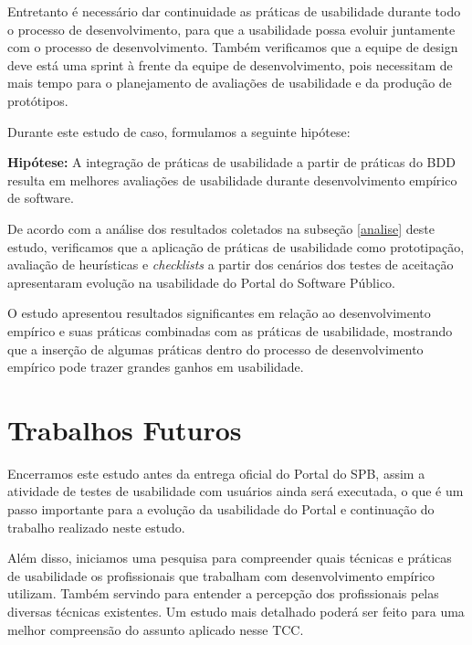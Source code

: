 Entretanto é necessário dar continuidade as práticas de usabilidade durante todo o processo de desenvolvimento, para que a usabilidade possa evoluir juntamente com o processo de desenvolvimento. Também verificamos que a equipe de design deve está uma sprint à frente da equipe de desenvolvimento, pois necessitam de mais tempo para o planejamento de avaliações de usabilidade e da produção de protótipos.




Durante este estudo de caso, formulamos a seguinte hipótese:

\textbf{Hipótese: } A integração de práticas de usabilidade a partir de práticas do BDD resulta em melhores avaliações de usabilidade durante desenvolvimento empírico de software.

De acordo com a análise dos resultados coletados na subseção \ref{analise} deste estudo, verificamos que a aplicação de práticas de usabilidade como prototipação, avaliação de heurísticas e \textit{checklists} a partir dos cenários dos testes de aceitação apresentaram evolução na usabilidade do Portal do Software Público.


O estudo apresentou resultados significantes em relação ao desenvolvimento empírico	e suas práticas combinadas com as práticas de usabilidade, mostrando que a inserção de algumas práticas dentro do processo de desenvolvimento empírico pode trazer grandes ganhos em usabilidade.

\section{Trabalhos Futuros}

Encerramos este estudo antes da entrega oficial do Portal do SPB, assim a atividade de testes de usabilidade com usuários ainda será executada, o que é um passo importante para a evolução da usabilidade do Portal e continuação do trabalho realizado neste estudo.

Além disso, iniciamos uma pesquisa para compreender quais técnicas e práticas de usabilidade os profissionais que trabalham com desenvolvimento empírico utilizam. Também servindo para entender a percepção dos profissionais pelas diversas técnicas existentes. Um estudo mais detalhado poderá ser feito para uma melhor compreensão do assunto aplicado nesse TCC. 

